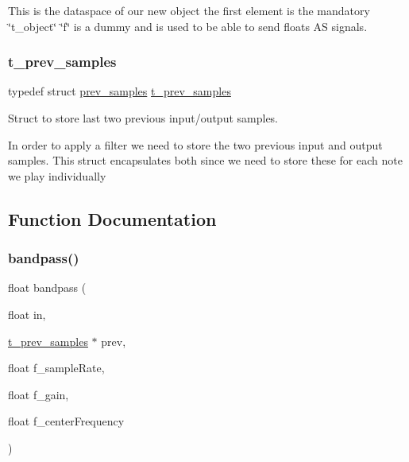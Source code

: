 This is the dataspace of our new object the first element is the mandatory \char`\"{}t\+\_\+object\char`\"{} \char`\"{}f\char`\"{} is a dummy and is used to be able to send floats AS signals. \mbox{\label{fofi~_8h_a728138bbe23514a1927f1f686090cd52}} 
\subsubsection{\texorpdfstring{t\_prev\_samples}{t\_prev\_samples}}
{\footnotesize\ttfamily typedef struct \mbox{\hyperlink{structprev__samples}{prev\+\_\+samples}}  \mbox{\hyperlink{fofi~_8h_a728138bbe23514a1927f1f686090cd52}{t\+\_\+prev\+\_\+samples}}}



Struct to store last two previous input/output samples. 

In order to apply a filter we need to store the two previous input and output samples. This struct encapsulates both since we need to store these for each note we play individually 

\subsection{Function Documentation}
\mbox{\label{fofi~_8h_a79bf4da8324cab6a31c4439c746821d8}} 
\subsubsection{\texorpdfstring{bandpass()}{bandpass()}}
{\footnotesize\ttfamily float bandpass (\begin{DoxyParamCaption}\item[{float}]{in,  }\item[{\mbox{\hyperlink{fofi~_8h_a728138bbe23514a1927f1f686090cd52}{t\+\_\+prev\+\_\+samples}} $\ast$}]{prev,  }\item[{float}]{f\+\_\+sample\+Rate,  }\item[{float}]{f\+\_\+gain,  }\item[{float}]{f\+\_\+center\+Frequency }\end{DoxyParamCaption})}



